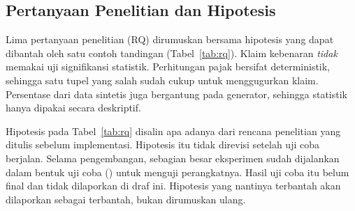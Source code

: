 \subsection{Pertanyaan Penelitian dan Hipotesis}
\label{subsec:rq}

Lima pertanyaan penelitian (RQ) dirumuskan bersama hipotesis yang dapat dibantah oleh satu contoh tandingan (Tabel~\ref{tab:rq}). Klaim kebenaran \emph{tidak} memakai uji signifikansi statistik. Perhitungan pajak bersifat deterministik, sehingga satu tupel yang salah sudah cukup untuk menggugurkan klaim. Persentase dari data sintetis juga bergantung pada generator, sehingga statistik hanya dipakai secara deskriptif.

Hipotesis pada Tabel~\ref{tab:rq} disalin apa adanya dari rencana penelitian yang ditulis sebelum implementasi. Hipotesis itu tidak direvisi setelah uji coba berjalan. Selama pengembangan, sebagian besar eksperimen sudah dijalankan dalam bentuk uji coba () untuk menguji perangkatnya. Hasil uji coba itu belum final dan tidak dilaporkan di draf ini. Hipotesis yang nantinya terbantah akan dilaporkan sebagai terbantah, bukan dirumuskan ulang.

